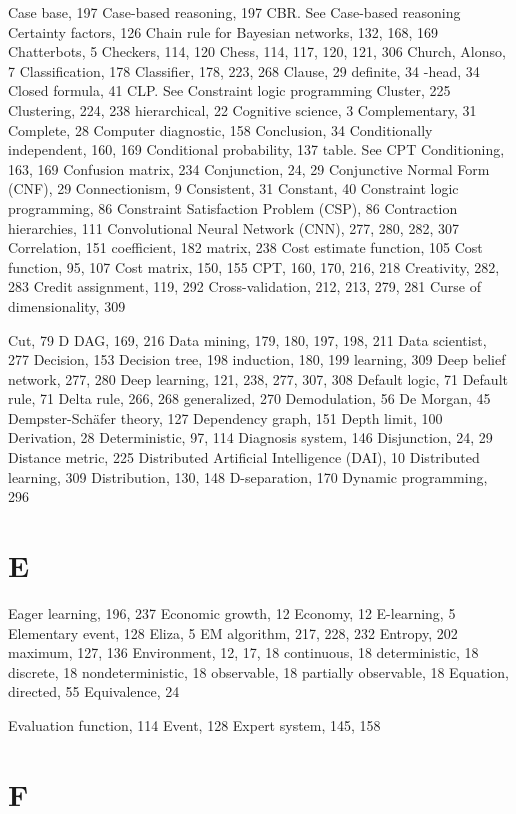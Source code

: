 \documentclass[10pt]{book}
\begin{document}
\begin{center}
Case base, 197
Case-based reasoning, 197
CBR. See Case-based reasoning
Certainty factors, 126
Chain rule for Bayesian networks, 132, 168, 169
Chatterbots, 5
Checkers, 114, 120
Chess, 114, 117, 120, 121, 306
Church, Alonso, 7
Classification, 178
Classifier, 178, 223, 268
Clause, 29
definite, 34
-head, 34
Closed formula, 41
CLP. See Constraint logic programming
Cluster, 225
Clustering, 224, 238
hierarchical, 22
Cognitive science, 3
Complementary, 31
Complete, 28
Computer diagnostic, 158
Conclusion, 34
Conditionally independent, 160, 169
Conditional probability, 137
table. See CPT
Conditioning, 163, 169
Confusion matrix, 234
Conjunction, 24, 29
Conjunctive Normal Form (CNF), 29
Connectionism, 9
Consistent, 31
Constant, 40
Constraint logic programming, 86
Constraint Satisfaction Problem (CSP), 86
Contraction hierarchies, 111
Convolutional Neural Network (CNN), 277, 280, 282, 307
Correlation, 151
coefficient, 182
matrix, 238
Cost estimate function, 105
Cost function, 95, 107
Cost matrix, 150, 155
CPT, 160, 170, 216, 218
Creativity, 282, 283
Credit assignment, 119, 292
Cross-validation, 212, 213, 279, 281
Curse of dimensionality, 309

Cut, 79
D
DAG, 169, 216
Data mining, 179, 180, 197, 198, 211
Data scientist, 277
Decision, 153
Decision tree, 198
induction, 180, 199
learning, 309
Deep belief network, 277, 280
Deep learning, 121, 238, 277, 307, 308
Default logic, 71
Default rule, 71
Delta rule, 266, 268
generalized, 270
Demodulation, 56
De Morgan, 45
Dempster-Sch{\"a}fer theory, 127
Dependency graph, 151
Depth limit, 100
Derivation, 28
Deterministic, 97, 114
Diagnosis system, 146
Disjunction, 24, 29
Distance metric, 225
Distributed Artificial Intelligence (DAI), 10
Distributed learning, 309
Distribution, 130, 148
D-separation, 170
Dynamic programming, 296

\section{E}

Eager learning, 196, 237
Economic growth, 12
Economy, 12
E-learning, 5
Elementary event, 128
Eliza, 5
EM algorithm, 217, 228, 232
Entropy, 202
maximum, 127, 136
Environment, 12, 17, 18
continuous, 18
deterministic, 18
discrete, 18
nondeterministic, 18
observable, 18
partially observable, 18
Equation, directed, 55
Equivalence, 24

Evaluation function, 114
Event, 128
Expert system, 145, 158
\section{F}


\end{center}
\end{document}
